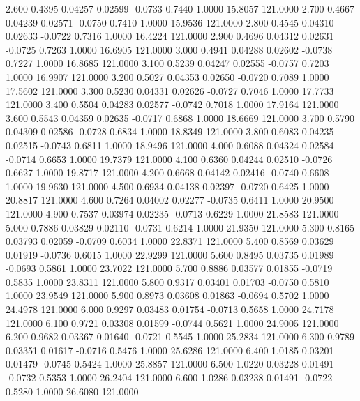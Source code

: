    2.600   0.4395   0.04257   0.02599  -0.0733   0.7440   1.0000  15.8057 121.0000
   2.700   0.4667   0.04239   0.02571  -0.0750   0.7410   1.0000  15.9536 121.0000
   2.800   0.4545   0.04310   0.02633  -0.0722   0.7316   1.0000  16.4224 121.0000
   2.900   0.4696   0.04312   0.02631  -0.0725   0.7263   1.0000  16.6905 121.0000
   3.000   0.4941   0.04288   0.02602  -0.0738   0.7227   1.0000  16.8685 121.0000
   3.100   0.5239   0.04247   0.02555  -0.0757   0.7203   1.0000  16.9907 121.0000
   3.200   0.5027   0.04353   0.02650  -0.0720   0.7089   1.0000  17.5602 121.0000
   3.300   0.5230   0.04331   0.02626  -0.0727   0.7046   1.0000  17.7733 121.0000
   3.400   0.5504   0.04283   0.02577  -0.0742   0.7018   1.0000  17.9164 121.0000
   3.600   0.5543   0.04359   0.02635  -0.0717   0.6868   1.0000  18.6669 121.0000
   3.700   0.5790   0.04309   0.02586  -0.0728   0.6834   1.0000  18.8349 121.0000
   3.800   0.6083   0.04235   0.02515  -0.0743   0.6811   1.0000  18.9496 121.0000
   4.000   0.6088   0.04324   0.02584  -0.0714   0.6653   1.0000  19.7379 121.0000
   4.100   0.6360   0.04244   0.02510  -0.0726   0.6627   1.0000  19.8717 121.0000
   4.200   0.6668   0.04142   0.02416  -0.0740   0.6608   1.0000  19.9630 121.0000
   4.500   0.6934   0.04138   0.02397  -0.0720   0.6425   1.0000  20.8817 121.0000
   4.600   0.7264   0.04002   0.02277  -0.0735   0.6411   1.0000  20.9500 121.0000
   4.900   0.7537   0.03974   0.02235  -0.0713   0.6229   1.0000  21.8583 121.0000
   5.000   0.7886   0.03829   0.02110  -0.0731   0.6214   1.0000  21.9350 121.0000
   5.300   0.8165   0.03793   0.02059  -0.0709   0.6034   1.0000  22.8371 121.0000
   5.400   0.8569   0.03629   0.01919  -0.0736   0.6015   1.0000  22.9299 121.0000
   5.600   0.8495   0.03735   0.01989  -0.0693   0.5861   1.0000  23.7022 121.0000
   5.700   0.8886   0.03577   0.01855  -0.0719   0.5835   1.0000  23.8311 121.0000
   5.800   0.9317   0.03401   0.01703  -0.0750   0.5810   1.0000  23.9549 121.0000
   5.900   0.8973   0.03608   0.01863  -0.0694   0.5702   1.0000  24.4978 121.0000
   6.000   0.9297   0.03483   0.01754  -0.0713   0.5658   1.0000  24.7178 121.0000
   6.100   0.9721   0.03308   0.01599  -0.0744   0.5621   1.0000  24.9005 121.0000
   6.200   0.9682   0.03367   0.01640  -0.0721   0.5545   1.0000  25.2834 121.0000
   6.300   0.9789   0.03351   0.01617  -0.0716   0.5476   1.0000  25.6286 121.0000
   6.400   1.0185   0.03201   0.01479  -0.0745   0.5424   1.0000  25.8857 121.0000
   6.500   1.0220   0.03228   0.01491  -0.0732   0.5353   1.0000  26.2404 121.0000
   6.600   1.0286   0.03238   0.01491  -0.0722   0.5280   1.0000  26.6080 121.0000
